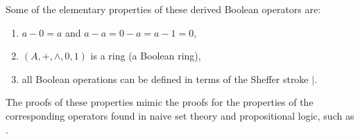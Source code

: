 \documentclass[12pt]{article}
\begin{document}
Some of the elementary properties of these derived Boolean operators are:
\begin{enumerate}
\item $a-0=a$ and $a-a=0-a=a-1=0$,
\item $(A,+,\wedge,0,1)$ is a ring (a Boolean ring),
\item all Boolean operations can be defined in terms of the Sheffer stroke $|$.
\end{enumerate}

The proofs of these properties mimic the proofs for the properties of the corresponding operators found in naive set theory and propositional logic, such as .
\end{document}
